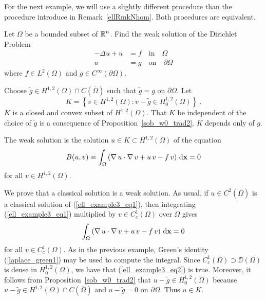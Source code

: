 For the next example, we will use a slightly different procedure than
the procedure introduce in Remark~\ref{ellRmkNhom}.  Both procedures
are equivalent.

\begin{egg}
Let $\Omega$ be a bounded subset of $\displaystyle \mathbb{R}^n$.  Find the
weak solution of the Dirichlet Problem
\begin{equation} \label{ell_example3_eq1}
\begin{split}
-\Delta u + u &= f \quad \text{in} \quad \Omega \\
u&= g \quad \text{on} \quad \partial \Omega
\end{split}
\end{equation}
where $\displaystyle f \in L^2(\Omega)$ and $g\in C^\infty(\partial \Omega)$.  

Choose
$\displaystyle \tilde{g} \in H^{1,2}(\Omega) \cap C(\overline{\Omega})$
such that
$\tilde{g}=g$ on $\partial \Omega$.  Let
\[
K = \left\{ v \in H^{1,2}(\Omega) : v - \tilde{g} \in H^{1,2}_0(\Omega)
\right\} \ .
\]
$K$ is a closed and convex subset of $\displaystyle H^{1,2}(\Omega)$.
That $K$ be independent of the choice of $\tilde{g}$ is a consequence of
Proposition~\ref{sob_w0_trad2}.  $K$ depends only of $g$.

The weak solution is the solution
$\displaystyle u\in K \subset H^{1,2}(\Omega)$ of the equation
\begin{equation} \label{ell_example3_eq2}
B(u,v) \equiv \int_\Omega \left( \operatorname{\nabla} u \cdot \operatorname{\nabla} v
+ u\, v - f\, v \right) \,\mathrm{d}{\mathbf{x}} = 0
\end{equation}
for all $\displaystyle v \in H^{1,2}(\Omega)$.

We prove that a classical solution is a weak solution.  As usual,
if $\displaystyle u\in C^2(\overline{\Omega})$ is a classical solution of
(\ref{ell_example3_eq1}), then integrating (\ref{ell_example3_eq1})
multiplied by $\displaystyle v \in C^1_c(\Omega)$ over $\Omega$ gives
\[
\int_\Omega \left( \operatorname{\nabla} u \cdot \operatorname{\nabla} v
+ u\, v - f\, v \right) \,\mathrm{d}{\mathbf{x}} = 0
\]
for all $\displaystyle v \in C^1_c(\Omega)$.
As in the previous example, Green's identity (\ref{laplace_green1})
may be used to compute the integral.  Since
$\displaystyle C^1_c(\Omega) \supset \DD(\Omega)$ is dense in
$\displaystyle H^{1,2}_0(\Omega)$, we have that
(\ref{ell_example3_eq2}) is true.  Moreover, it follows from 
Proposition~\ref{sob_w0_trad2} that
$\displaystyle u- \tilde{g} \in H^{1,2}_0(\Omega)$ because
$\displaystyle u - \tilde{g} \in H^{1,2}(\Omega)\cap C(\overline{\Omega})$ and
$u - \tilde{g}=0$ on $\partial \Omega$.  Thus $u\in K$.


\end{egg}
